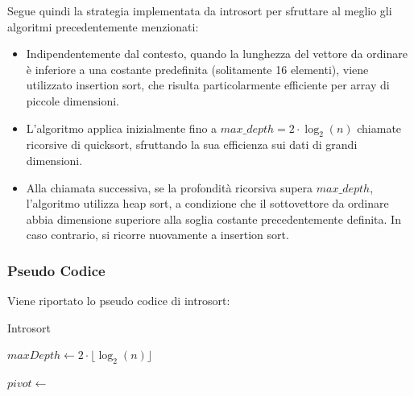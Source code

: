 \documentclass{article}
\begin{document}
        Segue quindi la strategia implementata da introsort per sfruttare al meglio gli algoritmi precedentemente menzionati:
        \begin{itemize}
            \item Indipendentemente dal contesto, quando la lunghezza del vettore da ordinare è inferiore a una costante predefinita (solitamente 16 elementi), viene utilizzato insertion sort, che risulta particolarmente efficiente per array di piccole dimensioni.
            \item L’algoritmo applica inizialmente fino a $max\_depth = 2 \cdot \log_2(n)$ chiamate ricorsive di quicksort, sfruttando la sua efficienza sui dati di grandi dimensioni.
            \item Alla chiamata successiva, se la profondità ricorsiva supera $max\_depth$, l’algoritmo utilizza heap sort, a condizione che il sottovettore da ordinare abbia dimensione superiore alla soglia costante precedentemente definita. In caso contrario, si ricorre nuovamente a insertion sort.
        \end{itemize}

        \subsubsection{Pseudo Codice}
            Viene riportato lo pseudo codice di introsort:

            \begin{algorithm}[H]
                \caption{Introsort}
                \begin{algorithmic}
                        \State $maxDepth \gets 2 \cdot \lfloor \log_2(n) \rfloor$
                        \State {}
                    \EndProcedure
    
                            \State {}
                            \State {}
                        \Else
                            \State $pivot \gets$ 
                            \State {}
                            \State {}
                        \EndIf
                    \EndProcedure
                \end{algorithmic}
            \end{algorithm}
    
\end{document}
